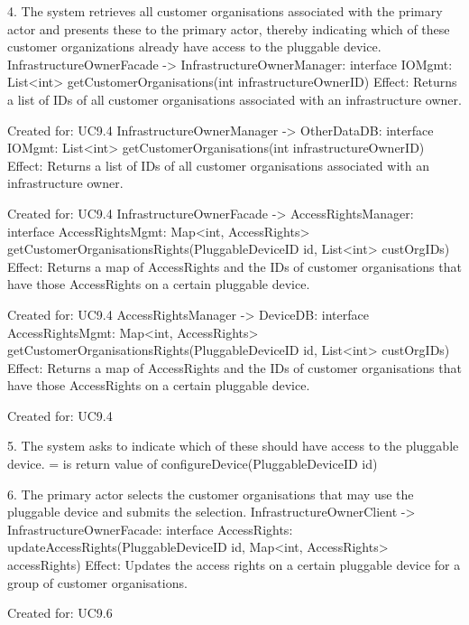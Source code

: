             4. The system retrieves all customer organisations associated with the primary actor and presents these to the primary actor,
               thereby indicating which of these customer organizations already have access to the pluggable device.
                InfrastructureOwnerFacade -> InfrastructureOwnerManager: interface IOMgmt:           List<int> getCustomerOrganisations(int infrastructureOwnerID)
                    Effect: Returns a list of IDs of all customer organisations associated with an infrastructure owner.
                    \item Created for: UC9.4
                InfrastructureOwnerManager -> OtherDataDB:               interface IOMgmt:           List<int> getCustomerOrganisations(int infrastructureOwnerID)
                    Effect: Returns a list of IDs of all customer organisations associated with an infrastructure owner.
                    \item Created for: UC9.4
                InfrastructureOwnerFacade -> AccessRightsManager:        interface AccessRightsMgmt: Map<int, AccessRights> getCustomerOrganisationsRights(PluggableDeviceID id, List<int> custOrgIDs)
                    Effect: Returns a map of AccessRights and the IDs of customer organisations that have those AccessRights on a certain pluggable device.
                    \item Created for: UC9.4
                AccessRightsManager -> DeviceDB:                         interface AccessRightsMgmt: Map<int, AccessRights> getCustomerOrganisationsRights(PluggableDeviceID id, List<int> custOrgIDs)
                    Effect: Returns a map of AccessRights and the IDs of customer organisations that have those AccessRights on a certain pluggable device.
                    \item Created for: UC9.4

            5. The system asks to indicate which of these should have access to the pluggable device.
                = is return value of configureDevice(PluggableDeviceID id)

            6. The primary actor selects the customer organisations that may use the pluggable device and submits the selection.
                InfrastructureOwnerClient -> InfrastructureOwnerFacade: interface AccessRights: updateAccessRights(PluggableDeviceID id, Map<int, AccessRights> accessRights)
                    Effect: Updates the access rights on a certain pluggable device for a group of customer organisations.
                    \item Created for: UC9.6

